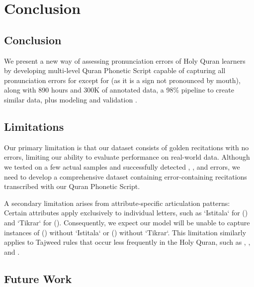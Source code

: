 
\chapter{Conclusion} %

\label{Chapter7} %


\section*{Conclusion}

We present a new way of assessing pronunciation errors of Holy Quran learners by developing multi-level Quran Phonetic Script capable of capturing all pronunciation errors for  except for  (as it is a sign not pronounced by mouth), along with 890 hours and 300K of annotated data, a 98\% pipeline to create similar data, plus modeling and validation \cite{citation}.


\section{Limitations}

Our primary limitation is that our dataset consists of golden recitations with no errors, limiting our ability to evaluate performance on real-world data. Although we tested on a few actual samples and successfully detected , , and  errors, we need to develop a comprehensive dataset containing error-containing recitations transcribed with our Quran Phonetic Script.

A secondary limitation arises from attribute-specific articulation patterns: Certain attributes apply exclusively to individual letters, such as `Istitala` for () and `Tikrar` for (). Consequently, we expect our model will be unable to capture instances of () without `Istitala` or () without `Tikrar`. This limitation similarly applies to Tajweed rules that occur less frequently in the Holy Quran, such as , , and .

\section{Future Work}

